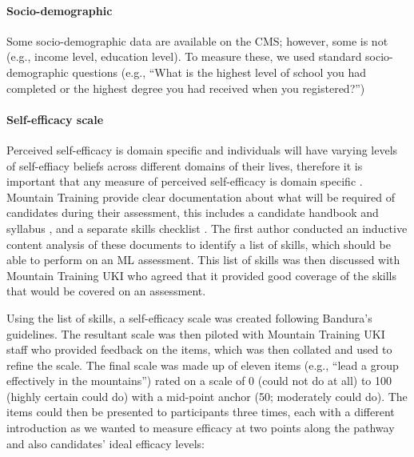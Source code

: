 \documentclass[a4paper,]{book}
\let\oldparagraph\paragraph
\renewcommand{\paragraph}[1]{\oldparagraph{#1}\mbox{}}
\begin{document}
\hypertarget{socio-demographic}{%
\paragraph{Socio-demographic}\label{socio-demographic}}

Some socio-demographic data are available on the CMS; however, some is not (e.g., income level, education level). To measure these, we used standard socio-demographic questions (e.g., ``What is the highest level of school you had completed or the highest degree you had received when you registered?'')

\hypertarget{self-efficacy-scale}{%
\paragraph{Self-efficacy scale}\label{self-efficacy-scale}}

Perceived self-efficacy is domain specific and individuals will have varying levels of self-effiacy beliefs across different domains of their lives, therefore it is important that any measure of perceived self-efficacy is domain specific \citep{Bandura1997, Bandura2006}. Mountain Training provide clear documentation about what will be required of candidates during their assessment, this includes a candidate handbook and syllabus \citep{MountainTrainingUK2015a}, and a separate skills checklist \citep{MountainTrainingUK2015}. The first author conducted an inductive content analysis \citep{Cho2014} of these documents to identify a list of skills, which should be able to perform on an ML assessment. This list of skills was then discussed with Mountain Training UKI who agreed that it provided good coverage of the skills that would be covered on an assessment.

Using the list of skills, a self-efficacy scale was created following Bandura's \citeyearpar{Bandura2006} guidelines. The resultant scale was then piloted with Mountain Training UKI staff who provided feedback on the items, which was then collated and used to refine the scale. The final scale was made up of eleven items (e.g., ``lead a group effectively in the mountains'') rated on a scale of 0 (could not do at all) to 100 (highly certain could do) with a mid-point anchor (50; moderately could do). The items could then be presented to participants three times, each with a different introduction as we wanted to measure efficacy at two points along the pathway and also candidates' ideal efficacy levels:
\end{document}
